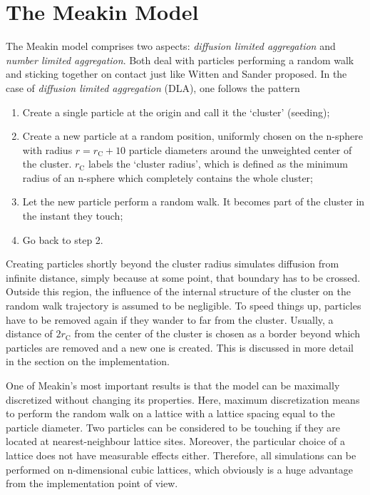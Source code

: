 \documentclass[twocolumn, 10pt]{scrartcl}
\begin{document}
    \section{The Meakin Model}
        The Meakin model comprises two aspects: \emph{diffusion limited aggregation} and \emph{number limited
        aggregation}. Both deal with particles performing a random walk and sticking together on contact just like
        Witten and Sander proposed. In the case of \emph{diffusion limited aggregation} (DLA), one follows the
        pattern
        \begin{enumerate}
            \item Create a single particle at the origin and call it the `cluster' (seeding);
            \item Create a new particle at a random position, uniformly chosen on the n-sphere with radius
                $r=r_\mathrm{C}+10$ particle diameters around the unweighted center of the cluster.
                $r_\mathrm{C}$ labels the `cluster radius', which
                is defined as the minimum radius of an n-sphere which completely contains the whole cluster;
            \item Let the new particle perform a random walk. It becomes part of the cluster in the instant
                they touch;
            \item Go back to step 2.
        \end{enumerate}
        Creating particles shortly beyond the cluster radius simulates diffusion from infinite distance, simply
        because at some point, that boundary has to be crossed. Outside this region, the influence of the
        internal structure of the cluster on the random walk trajectory is assumed to be negligible. To speed things up,
        particles have to be removed again if they wander to far from the cluster. Usually, a distance of
        $2r_\mathrm{C}$ from the center of the cluster is chosen as a border beyond which particles are removed
        and a new one is created. This is discussed in more detail in the section on the implementation.
       
        One of Meakin's most important results is that the model can be maximally discretized without changing
        its properties. Here, maximum discretization means to perform the random walk on a lattice with
        a lattice spacing equal to the particle diameter. Two particles can be considered to be touching if
        they are located at nearest-neighbour lattice sites. Moreover, the particular choice of a lattice does
        not have measurable effects either. Therefore, all simulations can be performed on n-dimensional
        cubic lattices, which obviously is a huge advantage from the implementation point of view.
\end{document}
